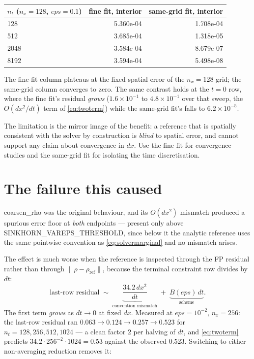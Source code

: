\documentclass[11pt]{article}
\newcommand{\eps}{\varepsilon}
\newcommand{\dt}{\Delta t}
\newcommand{\dx}{\Delta x}
\newcommand{\code}[1]{\texttt{#1}}
\def\eps{eps}\def\dt{dt}\def\dx{dx}\def\code#1{#1}%
\begin{document}
\begin{center}
\begin{tabular}{@{}lrr@{}}
\toprule
$n_t$ ($n_x=128$, $\eps=0.1$) & fine fit, interior & same-grid fit, interior \\
\midrule
128  & 5.360e-04 & 1.708e-04 \\
512  & 3.685e-04 & 1.318e-05 \\
2048 & 3.584e-04 & 8.679e-07 \\
8192 & 3.594e-04 & 5.498e-08 \\
\bottomrule
\end{tabular}
\end{center}

\noindent
The fine-fit column plateaus at the fixed spatial error of the $n_x=128$ grid;
the same-grid column converges to zero. The same contrast holds at the $t=0$
row, where the fine fit's residual \emph{grows} ($1.6\times10^{-1}$ to
$4.8\times10^{-1}$ over that sweep, the $O(\dx^2/\dt)$ term of
\eqref{eq:twoterm}) while the same-grid fit's falls to $6.2\times10^{-5}$.

The limitation is the mirror image of the benefit: a reference that is
spatially consistent with the solver by construction is \emph{blind} to
spatial error, and cannot support any claim about convergence in $\dx$. Use
the fine fit for convergence studies and the same-grid fit for isolating the
time discretisation.

\section{The failure this caused}

\code{coarsen\_rho} was the original behaviour, and its $O(\dx^2)$ mismatch
produced a spurious error floor at \emph{both} endpoints --- present only above
\code{SINKHORN\_VAREPS\_THRESHOLD}, since below it the analytic reference uses
the same pointwise convention as \eqref{eq:solvermarginal} and no mismatch
arises.

The effect is much worse when the reference is inspected through the FP
residual rather than through $\|\rho-\rho_{\text{ref}}\|$, because the terminal
constraint row divides by $\dt$:
\begin{equation}
  \text{last-row residual}
  \;\sim\; \underbrace{\frac{34.2\,\dx^2}{\dt}}_{\text{convention mismatch}}
  \;+\; \underbrace{B(\eps)\,\dt}_{\text{scheme}} .
  \label{eq:twoterm}
\end{equation}
The first term \emph{grows} as $\dt\to0$ at fixed $\dx$. Measured at
$\eps=10^{-2}$, $n_x=256$: the last-row residual ran
$0.063\to0.124\to0.257\to0.523$ for $n_t=128,256,512,1024$ --- a clean factor
$2$ per halving of $\dt$, and \eqref{eq:twoterm} predicts
$34.2\cdot256^{-2}\cdot1024 = 0.53$ against the observed $0.523$. Switching to
either non-averaging reduction removes it:
\end{document}
